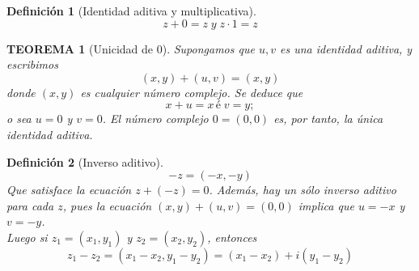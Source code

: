 \documentclass[10pt]{book}
\newtheorem{teo}{\textbf{TEOREMA}}[chapter]%
\newtheorem{def.}{\textbf{Definición}}[chapter]%
\begin{document}
\begin{tcolorbox}[colback = white]
\begin{def.}[Identidad aditiva y multiplicativa]
$$z+0=z \; y \; z\cdot 1 = z$$
\end{def.}
\end{tcolorbox}

\begin{teo}[Unicidad de 0]
Supongamos que $u,v$ es una identidad aditiva, y escribimos $$(x,y)+(u,v) = (x,y)$$ donde $(x,y)$ es cualquier número complejo. Se deduce que $$x+u=x \, é \; v=y;$$ o sea $u=0$ y $v=0$. El número complejo $0=(0,0)$ es, por tanto, la única identidad aditiva. 
\end{teo}

\begin{tcolorbox}[colback = white]
\begin{def.}[Inverso aditivo]
$$-z=(-x,-y)$$ Que satisface la ecuación $z+(-z) =0$. Además, hay un sólo inverso aditivo para cada $z$, pues la ecuación $(x,y)+(u,v)=(0,0)$ implica que $u=-x$ y $v=-y$.\\
Luego si $z_1 = (x_1,y_1)$ y $z_2=(x_2,y_2)$, entonces 
$$z_1 - z_2 = (x_1-x_2,y_1-y_2) = (x_1-x_2)+i(y_1-y_2)$$
\end{def.}
\end{tcolorbox}
\end{document}
